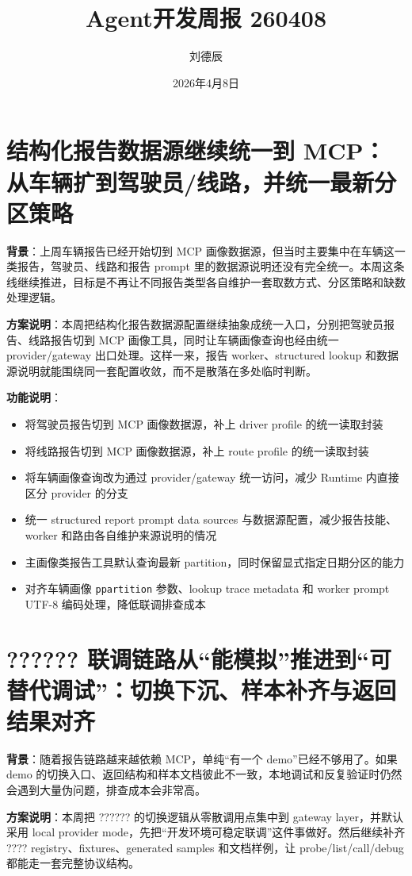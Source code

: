\documentclass[UTF8]{ctexart}
\title{Agent开发周报 260408}
\author{刘德辰}
\date{2026年4月8日}
\begin{document}
\maketitle

\section{结构化报告数据源继续统一到 MCP：从车辆扩到驾驶员/线路，并统一最新分区策略}

\textbf{背景}：上周车辆报告已经开始切到 MCP 画像数据源，但当时主要集中在车辆这一类报告，驾驶员、线路和报告 prompt 里的数据源说明还没有完全统一。本周这条线继续推进，目标是不再让不同报告类型各自维护一套取数方式、分区策略和缺数处理逻辑。

\textbf{方案说明}：本周把结构化报告数据源配置继续抽象成统一入口，分别把驾驶员报告、线路报告切到 MCP 画像工具，同时让车辆画像查询也经由统一 provider/gateway 出口处理。这样一来，报告 worker、structured lookup 和数据源说明就能围绕同一套配置收敛，而不是散落在多处临时判断。

\textbf{功能说明}：
\begin{itemize}
\item 将驾驶员报告切到 MCP 画像数据源，补上 driver profile 的统一读取封装
\item 将线路报告切到 MCP 画像数据源，补上 route profile 的统一读取封装
\item 将车辆画像查询改为通过 provider/gateway 统一访问，减少 Runtime 内直接区分 provider 的分支
\item 统一 structured report prompt data sources 与数据源配置，减少报告技能、worker 和路由各自维护来源说明的情况
\item 主画像类报告工具默认查询最新 partition，同时保留显式指定日期分区的能力
\item 对齐车辆画像 \texttt{ppartition} 参数、lookup trace metadata 和 worker prompt UTF-8 编码处理，降低联调排查成本
\end{itemize}

\section{?????? 联调链路从“能模拟”推进到“可替代调试”：切换下沉、样本补齐与返回结果对齐}

\textbf{背景}：随着报告链路越来越依赖 MCP，单纯“有一个 demo”已经不够用了。如果 demo 的切换入口、返回结构和样本文档彼此不一致，本地调试和反复验证时仍然会遇到大量伪问题，排查成本会非常高。

\textbf{方案说明}：本周把 ?????? 的切换逻辑从零散调用点集中到 gateway layer，并默认采用 local provider mode，先把“开发环境可稳定联调”这件事做好。然后继续补齐 ???? registry、fixtures、generated samples 和文档样例，让 probe/list/call/debug 都能走一套完整协议结构。
\end{document}
